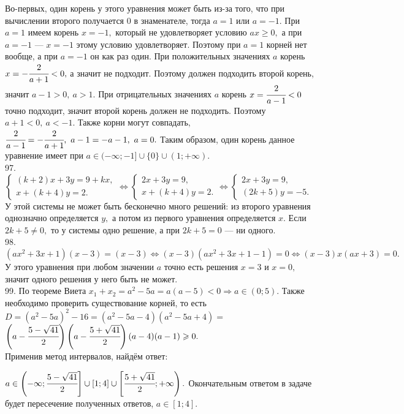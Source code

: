 Во-первых, один корень у этого уравнения может быть из-за того, что при вычислении второго получается 0 в знаменателе, тогда $a=1$ или $a=-1.$ При $a=1$ имеем корень $x=-1,$ который не удовлетворяет условию $ax\geqslant0,$ а при $a=-1$ --- $x=-1$ этому условию удовлетворяет. Поэтому при $a=1$ корней нет вообще, а при $a=-1$ он как раз один. При положительных значениях $a$ корень $x=-\cfrac{2}{a+1}<0,$ а значит не подходит. Поэтому должен подходить второй корень, значит $a-1>0,\ a>1.$ При отрицательных значениях $a$ корень $x=\cfrac{2}{a-1}<0$ точно подходит, значит второй корень должен не подходить. Поэтому $a+1<0,\ a<-1.$ Также корни могут совпадать, $\cfrac{2}{a-1}=-\cfrac{2}{a+1},\ a-1=-a-1,\ a=0.$ Таким образом, один корень данное уравнение имеет при $a\in(-\infty;-1]\cup\{0\}\cup(1;+\infty).$\\
97. $\begin{cases}
(k+2)x+3y=9+kx,\\
x+(k+4)y=2.
\end{cases}\Leftrightarrow\begin{cases}
2x+3y=9,\\
x+(k+4)y=2.
\end{cases}\Leftrightarrow\begin{cases}
2x+3y=9,\\
(2k+5)y=-5.
\end{cases}$
У этой системы не может быть бесконечно много решений: из второго уравнения однозначно определяется $y,$ а потом из первого уравнения определяется $x.$ Если $2k+5\neq0,$ то у системы одно решение, а при $2k+5=0$ --- ни одного.\\
98. $(ax^2+3x+1)(x-3)=(x-3)\Leftrightarrow (x-3)(ax^2+3x+1-1)=0\Leftrightarrow (x-3)x(ax+3)=0.$ У этого уравнения при любом значении $a$ точно есть решения $x=3$ и $x=0,$ значит одного решения у него быть не может.\\
99. По теореме Виета $x_1+x_2=a^2-5a=a(a-5)<0\Rightarrow a\in(0;5).$ Также необходимо проверить существование корней, то есть $D=(a^2-5a)^2-16=
(a^2-5a-4)(a^2-5a+4)=$\\$\left(a-\cfrac{5-\sqrt{41}}{2}\right)\left(a-\cfrac{5+\sqrt{41}}{2}\right)(a-4)(a-1)\geqslant0.$\\ Применив метод интервалов, найдём ответ:
\begin{figure}[ht!]
\end{figure}
$a\in\left(-\infty;\cfrac{5-\sqrt{41}}{2}\right]\cup[1;4]\cup\left[\cfrac{5+\sqrt{41}}{2};+\infty\right).$
Окончательным ответом в задаче будет пересечение полученных ответов, $a\in [1;4].$\\
